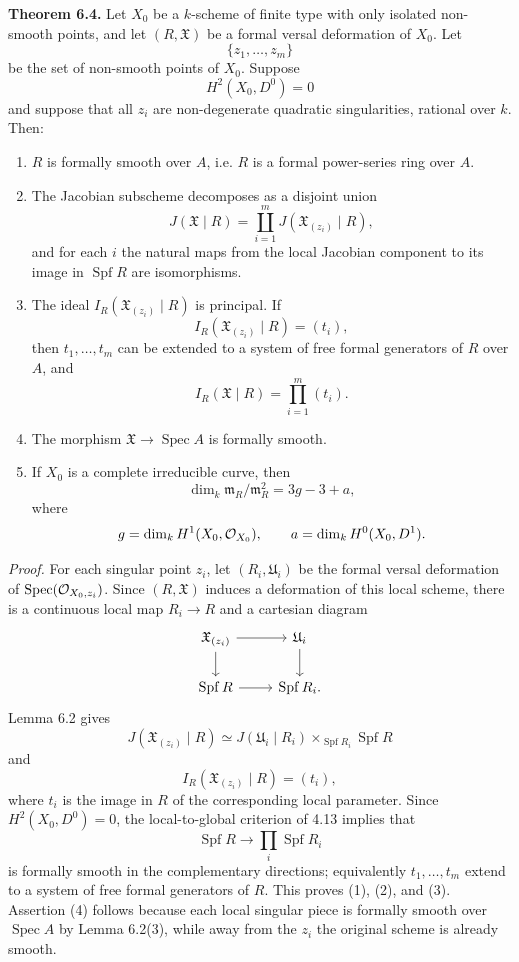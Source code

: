 \documentclass[11pt]{article}
\providecommand{\Spec}{\operatorname{Spec}}
\providecommand{\Spf}{\operatorname{Spf}}
\begin{document}
\textbf{Theorem 6.4.}  Let \(X_0\) be a \(k\)-scheme of finite type with only isolated non-smooth points, and let \((R,\mathfrak X)\) be a formal versal deformation of \(X_0\).  Let
\[
        \{z_1,\ldots,z_m\}
\]
be the set of non-smooth points of \(X_0\).  Suppose
\[
        H^2(X_0,D^0)=0
\]
and suppose that all \(z_i\) are non-degenerate quadratic singularities, rational over \(k\).  Then:
\begin{enumerate}[label=(\arabic*)]
\item \(R\) is formally smooth over \(A\), i.e. \(R\) is a formal power-series ring over \(A\).
\item The Jacobian subscheme decomposes as a disjoint union
\[
        J(\mathfrak X\mid R)
        =
        \coprod_{i=1}^m J(\mathfrak X_{(z_i)}\mid R),
\]
and for each \(i\) the natural maps from the local Jacobian component to its image in \(\Spf R\) are isomorphisms.
\item The ideal \(I_R(\mathfrak X_{(z_i)}\mid R)\) is principal.  If
\[
        I_R(\mathfrak X_{(z_i)}\mid R)=(t_i),
\]
then \(t_1,\ldots,t_m\) can be extended to a system of free formal generators of \(R\) over \(A\), and
\[
        I_R(\mathfrak X\mid R)=\prod_{i=1}^m(t_i).
\]
\item The morphism \(\mathfrak X\to\Spec A\) is formally smooth.
\item If \(X_0\) is a complete irreducible curve, then
\[
        \dim_k\mathfrak m_R/\mathfrak m_R^2
        =
        3g-3+a,
\]
where
\[
        g=\dim_k H^1(X_0,\mathcal O_{X_0}),
        \qquad
        a=\dim_k H^0(X_0,D^1).
\]
\end{enumerate}

\emph{Proof.}  For each singular point \(z_i\), let \((R_i,\mathfrak U_i)\) be the formal versal deformation of \(\Spec(\Oo_{X_0,z_i})\).  Since \((R,\mathfrak X)\) induces a deformation of this local scheme, there is a continuous local map \(R_i\to R\) and a cartesian diagram
\[
\begin{tikzcd}
\mathfrak X_{(z_i)} \arrow[r] \arrow[d] &
\mathfrak U_i \arrow[d]\\
\Spf R \arrow[r] & \Spf R_i .
\end{tikzcd}
\]
Lemma 6.2 gives
\[
        J(\mathfrak X_{(z_i)}\mid R)
        \simeq
        J(\mathfrak U_i\mid R_i)\times_{\Spf R_i}\Spf R
\]
and
\[
        I_R(\mathfrak X_{(z_i)}\mid R)=(t_i),
\]
where \(t_i\) is the image in \(R\) of the corresponding local parameter.  Since \(H^2(X_0,D^0)=0\), the local-to-global criterion of 4.13 implies that
\[
        \Spf R\longrightarrow \prod_i\Spf R_i
\]
is formally smooth in the complementary directions; equivalently \(t_1,\ldots,t_m\) extend to a system of free formal generators of \(R\).  This proves (1), (2), and (3).  Assertion (4) follows because each local singular piece is formally smooth over \(\Spec A\) by Lemma 6.2(3), while away from the \(z_i\) the original scheme is already smooth.
\end{document}
